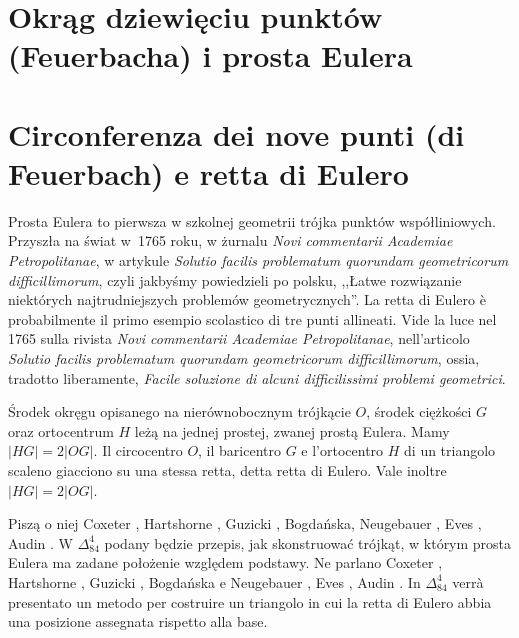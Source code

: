 
%

\section{Okrąg dziewięciu punktów (Feuerbacha) i prosta Eulera} %
\section{Circonferenza dei nove punti (di Feuerbach) e retta di Eulero} %


Prosta Eulera to pierwsza w szkolnej geometrii trójka punktów współliniowych. %
Przyszła na świat w~1765 roku, w żurnalu \emph{Novi commentarii Academiae Petropolitanae}, w artykule \emph{Solutio facilis problematum quorundam geometricorum difficillimorum}, czyli jakbyśmy powiedzieli po polsku, ,,Łatwe rozwiązanie niektórych najtrudniejszych problemów geometrycznych''. %
La retta di Eulero è probabilmente il primo esempio scolastico di tre punti allineati. %
Vide la luce nel 1765 sulla rivista \emph{Novi commentarii Academiae Petropolitanae}, nell'articolo \emph{Solutio facilis problematum quorundam geometricorum difficillimorum}, ossia, tradotto liberamente, \emph{Facile soluzione di alcuni difficilissimi problemi geometrici}. %

\begin{proposition}
[prosta Eulera] %
[retta di Eulero] %
    \label{prosta_eulera}
    Środek okręgu opisanego na nierównobocznym trójkącie $O$, środek ciężkości $G$ oraz ortocentrum $H$ leżą na jednej prostej, zwanej prostą Eulera. %
    Mamy $|HG| = 2|OG|$. %
    Il circocentro $O$, il baricentro $G$ e l'ortocentro $H$ di un triangolo scaleno giacciono su una stessa retta, detta retta di Eulero. %
    Vale inoltre $|HG| = 2|OG|$. %
\end{proposition}

Piszą o niej Coxeter \cite[s. 32, 33]{coxeter_1967}, Hartshorne \cite[s. 54, 55]{hartshorne_2000}, Guzicki \cite[s. 222]{guzicki_2021}, Bogdańska, Neugebauer \cite[s. 84]{neugebauer_2018}, Eves \cite[s. 109]{eves1_1972}, Audin \cite[s. 61]{audin_2003}. %
W $\Delta_{84}^{4}$ podany będzie przepis, jak skonstruować trójkąt, w którym prosta Eulera ma zadane położenie względem podstawy. %
Ne parlano Coxeter \cite[p. 32, 33]{coxeter_1967}, Hartshorne \cite[p. 54, 55]{hartshorne_2000}, Guzicki \cite[p. 222]{guzicki_2021}, Bogdańska e Neugebauer \cite[p. 84]{neugebauer_2018}, Eves \cite[p. 109]{eves1_1972}, Audin \cite[p. 61]{audin_2003}. %
In $\Delta_{84}^{4}$ verrà presentato un metodo per costruire un triangolo in cui la retta di Eulero abbia una posizione assegnata rispetto alla base. %

